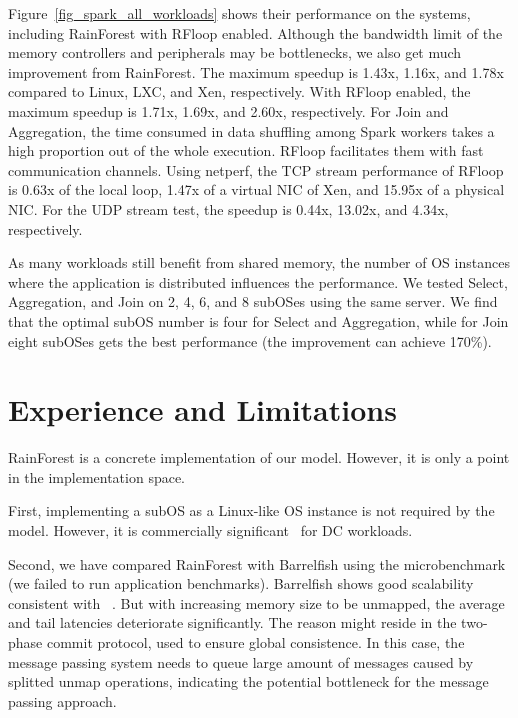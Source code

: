 \documentclass[pageno]{jpaper}
\begin{document}
Figure~\ref{fig_spark_all_workloads} shows their performance on the systems, including RainForest with RFloop enabled. Although the bandwidth limit of the memory controllers and peripherals may be bottlenecks, we also get much improvement from RainForest. The maximum speedup is 1.43x, 1.16x, and 1.78x  compared to Linux, LXC, and Xen, respectively. With RFloop enabled, the maximum speedup is  1.71x, 1.69x, and 2.60x, respectively. For Join and Aggregation, the time consumed in data shuffling among Spark workers takes a high proportion out of the whole execution. RFloop facilitates them with fast communication channels. Using netperf, the TCP stream performance of RFloop is 0.63x of the local loop, 1.47x of a virtual NIC of Xen, and 15.95x of a physical NIC. For the UDP stream test, the speedup is 0.44x, 13.02x, and 4.34x, respectively.

As many workloads still benefit from shared memory, the number of OS instances where the application is distributed influences the performance. We tested Select, Aggregation, and Join on 2, 4, 6, and 8 subOSes using the same server. We find that the optimal subOS number is four for Select and Aggregation, while for Join eight subOSes gets the best performance (the improvement can achieve 170\%).
 \section{Experience and Limitations}













RainForest is a concrete implementation of our model. However, it is only a point in the implementation space.

First, implementing a subOS as a Linux-like OS instance is not required by the model. However, it is commercially significant~\cite{banga1999resource} for DC workloads.  


Second, we have compared RainForest with Barrelfish using the  microbenchmark (we failed to run application benchmarks). Barrelfish shows good scalability consistent with ~\cite{ Baumann:2009:multikernel}. But with increasing memory size to be unmapped, the average and tail latencies deteriorate significantly. The reason might reside in the two-phase commit protocol, used to ensure global consistence. In this case, the message passing system needs to queue large amount of messages caused by splitted unmap operations, indicating the potential bottleneck for the message passing approach.
\end{document}
